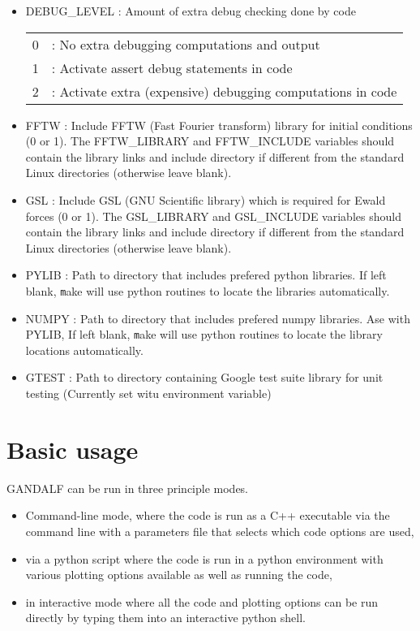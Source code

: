 \documentclass[a4paper]{article}
\newcommand{\var}[1]{\texttt{#1}}
\begin{document}
\begin{itemize}
\item DEBUG\_LEVEL : Amount of extra debug checking done by code \\
\begin{tabular}{ll}
0 & : No extra debugging computations and output \\
1 & : Activate assert debug statements in code \\
2 & : Activate extra (expensive) debugging computations in code
\end{tabular}

\item FFTW : Include FFTW (Fast Fourier transform) library for initial conditions (0 or 1).  The FFTW\_LIBRARY and FFTW\_INCLUDE variables should contain the library links and include directory if different from the standard Linux directories (otherwise leave blank).

\item GSL : Include GSL (GNU Scientific library) which is required for Ewald forces (0 or 1). The GSL\_LIBRARY and GSL\_INCLUDE variables should contain the library links and include directory if different from the standard Linux directories (otherwise leave blank).

\item PYLIB : Path to directory that includes prefered python libraries.  If left blank, {\var make} will use python routines to locate the libraries automatically.

\item NUMPY : Path to directory that includes prefered numpy libraries.  Ase with PYLIB, If left blank, {\var make} will use python routines to locate the library locations automatically.

\item GTEST : Path to directory containing Google test suite library for unit testing (Currently set witu environment variable)

\end{itemize}

\newpage


\section{Basic usage}
GANDALF can be run in three principle modes.
\begin{itemize}
\item Command-line mode, where the code is run as a C++ executable via the command line with a parameters file that selects which code options are used,
\item via a python script where the code is run in a python environment with various plotting options available as well as running the code,
\item in interactive mode where all the code and plotting options can be run directly by typing them into an interactive python shell.
\end{itemize}
\end{document}
